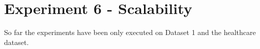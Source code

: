 \newpage
\section{Experiment 6 - Scalability}
\label{sec:exp6}
So far the experiments have been only executed on Dataset 1 and the healthcare dataset.